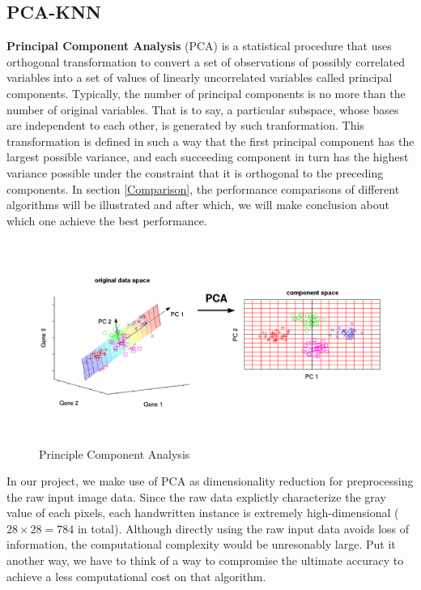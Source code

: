 \documentclass{article} %
\begin{document}
\subsection{PCA-KNN} 
{\bf Principal Component Analysis} (PCA) is a statistical procedure that uses
orthogonal transformation to convert a set of observations of possibly
correlated variables into a set of values of linearly uncorrelated variables
called principal components. Typically, the number of principal components is
no more than the number of original variables. That is to say, a particular
subspace, whose bases are independent to each other, is generated by such
tranformation. This transformation is defined in such a way that the first
principal component has the largest possible variance, and each succeeding
component in turn has the highest variance possible under the constraint that
it is orthogonal to the preceding components. In section \ref{Comparison}, the
performance comparisons of different algorithms will be illustrated and after
which, we will make conclusion about which one achieve the best performance. 

\begin{figure}[h]
    \centering
    \includegraphics[height=2.6in,width=5.2in]{./images/PCA.png}
    \caption{Principle Component Analysis}
\end{figure}

In our project, we make use of PCA as dimensionality reduction for preprocessing the raw input image data.
Since the raw data explictly characterize the gray value of each pixels, each
handwritten instance is extremely high-dimensional ($28\times 28 = 784$ in
total). Although directly using the raw input data avoids loss of information,
the computational complexity would be unresonably large. Put it another way,
we have to think of a way to compromise the ultimate accuracy to achieve a
less computational cost on that algorithm. 
\end{document}
